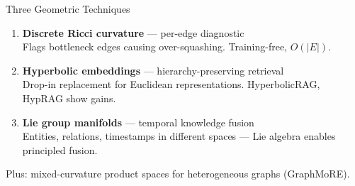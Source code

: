 \documentclass[aspectratio=169]{beamer}
\begin{document}
\begin{frame}{Three Geometric Techniques}
  \begin{enumerate}
    \item \textbf{Discrete Ricci curvature} --- per-edge diagnostic\\
      {\small Flags bottleneck edges causing over-squashing.
      Training-free, $O(|E|)$.}

    \vspace{0.2cm}

    \item \textbf{Hyperbolic embeddings} --- hierarchy-preserving retrieval\\
      {\small Drop-in replacement for Euclidean representations.
      HyperbolicRAG, HypRAG show gains.}

    \vspace{0.2cm}

    \item \textbf{Lie group manifolds} --- temporal knowledge fusion\\
      {\small Entities, relations, timestamps in different spaces ---
      Lie algebra enables principled fusion.}
  \end{enumerate}

  \vspace{0.1cm}

  {\small Plus: mixed-curvature product spaces for heterogeneous graphs (GraphMoRE).}
\end{frame}
\end{document}

